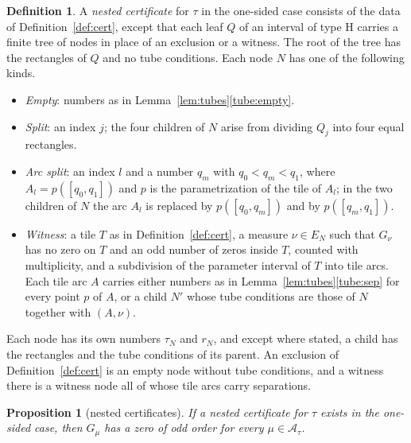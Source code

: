 \documentclass[11pt]{amsart}
\newtheorem{proposition}[theorem]{Proposition}
\theoremstyle{definition}
\newtheorem{definition}[theorem]{Definition}
\theoremstyle{remark}
\numberwithin{equation}{section}
\begin{document}
\begin{definition}\label{def:nested}
A \emph{nested certificate} for $\tau$ in the one-sided case consists of the data of Definition~\ref{def:cert}, except that each leaf $Q$ of an interval of type H carries a finite tree of nodes in place of an exclusion or a witness. The root of the tree has the rectangles of $Q$ and no tube conditions. Each node $N$ has one of the following kinds.
\begin{itemize}
\item \emph{Empty}: numbers as in Lemma~\ref{lem:tubes}\ref{tube:empty}.
\item \emph{Split}: an index $j$; the four children of $N$ arise from dividing $Q_j$ into four equal rectangles.
\item \emph{Arc split}: an index $l$ and a number $q_m$ with $q_0<q_m<q_1$, where $A_l=p([q_0,q_1])$ and $p$ is the parametrization of the tile of $A_l$; in the two children of $N$ the arc $A_l$ is replaced by $p([q_0,q_m])$ and by $p([q_m,q_1])$.
\item \emph{Witness}: a tile $T$ as in Definition~\ref{def:cert}, a measure $\nu\in E_N$ such that $G_\nu$ has no zero on $T$ and an odd number of zeros inside $T$, counted with multiplicity, and a subdivision of the parameter interval of $T$ into tile arcs. Each tile arc $A$ carries either numbers as in Lemma~\ref{lem:tubes}\ref{tube:sep} for every point $p$ of $A$, or a child $N'$ whose tube conditions are those of $N$ together with $(A,\nu)$.
\end{itemize}
Each node has its own numbers $\tau_N$ and $r_N$, and except where stated, a child has the rectangles and the tube conditions of its parent. An exclusion of Definition~\ref{def:cert} is an empty node without tube conditions, and a witness there is a witness node all of whose tile arcs carry separations.
\end{definition}

\begin{proposition}[nested certificates]\label{prop:nested}
If a nested certificate for $\tau$ exists in the one-sided case, then $G_\mu$ has a zero of odd order for every $\mu\in\mathcal A_\tau$.
\end{proposition}
\end{document}

